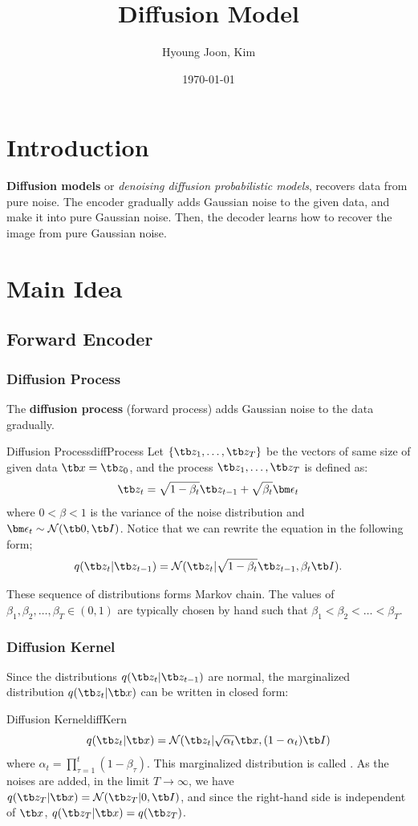 \documentclass{article}
\title{Diffusion Model}
\author{Hyoung Joon, Kim}
\date{\today}
\begin{document}
\maketitle
\tableofcontents
\newpage

\section{Introduction}
    \textbf{Diffusion models} or \emph{denoising diffusion probabilistic models}, recovers data from pure noise. The encoder gradually adds Gaussian noise to the given data,
    and make it into pure Gaussian noise. Then, the decoder learns how to recover the image from pure Gaussian noise.
\section{Main Idea}
    \subsection{Forward Encoder}
        \subsubsection{Diffusion Process}
            The \textbf{diffusion process} (forward process) adds Gaussian noise to the data gradually.
            \begin{defn}{Diffusion Process}{diffProcess}
                Let $\{\tb z_1,\dots,\tb z_T\}$ be the vectors of same size of given data $\tb x = \tb z_0$,
                and the process $\tb z_1,\dots,\tb z_T$ is defined as:
                \[
                \tb z_t = \sqrt{1-\beta_t}\tb z_{t-1} + \sqrt{\beta_t}\bm\epsilon_t
                \]
                where $0 < \beta < 1$ is the variance of the noise distribution and $\bm\epsilon_t \sim \mathcal{N}(\tb 0, \tb I)$. Notice that we can rewrite the equation in the following form;
                \[
                q(\tb z_t|\tb z_{t-1})=\mathcal{N}(\tb z_t|\sqrt{1-\beta_t}\tb z_{t-1}, \beta_t\tb I).
                \]
            \end{defn}
            These sequence of distributions forms Markov chain. The values of $\beta_1,\beta_2,\dots,\beta_T \in (0,1)$ are typically chosen by hand such that $\beta_1 < \beta_2 < \dots < \beta_T$.
        \subsubsection{Diffusion Kernel}
            Since the distributions $q(\tb z_t|\tb z_{t-1})$ are normal, the marginalized distribution $q(\tb z_t | \tb x)$ can be written in closed form:
            \begin{thm}{Diffusion Kernel}{diffKern}
                \[
                q(\tb z_t|\tb x) = \mathcal{N}(\tb z_t|\sqrt{\alpha_t}\tb x, (1-\alpha_t)\tb I)
                \]
                where $\alpha_t = \prod_{\tau=1}^{t}(1-\beta_\tau)$. This marginalized distribution is called . As the noises are added, in the limit $T \to \infty$,
                we have $q(\tb z_T|\tb x)=\mathcal{N}(\tb z_T|0,\tb I)$, and since the right-hand side is independent of $\tb x$, $q(\tb z_T|\tb x)=q(\tb z_T)$.
            \end{thm}
\end{document}
